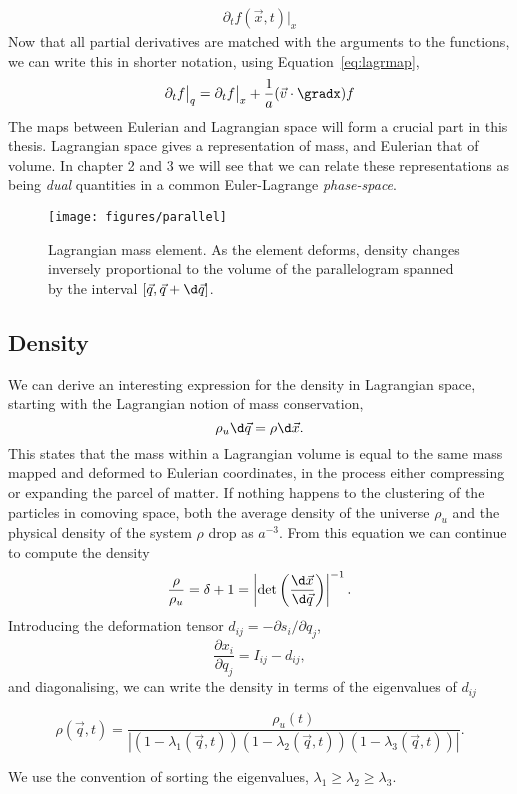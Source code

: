 \begin{subappendices}
\begin{align}
\partial_t f(\vec{x}, t)\big|_x
\end{align}
Now that all partial derivatives are matched with the arguments to the functions, we can write this in shorter notation, using Equation~\ref{eq:lagrmap},
\begin{equation}
\partial_t f \big|_q = \partial_t f \big|_x + \frac{1}{a} (\vec{v} \cdot \gradx) f
\end{equation}
The maps between Eulerian and Lagrangian space will form a crucial part in this thesis. Lagrangian space gives a representation of mass, and Eulerian that of volume. In chapter 2 and 3 we will see that we can relate these representations as being \emph{dual} quantities in a common Euler-Lagrange \emph{phase-space}. \\

\begin{SCfigure}[2.0]
    \texttt{[image: figures/parallel]}
    \caption{Lagrangian mass element. As the element deforms, density changes inversely proportional to the volume of the parallelogram spanned by the interval $[\vec{q}, \vec{q} + \d\vec{q}]$.} \label{fig:parallel}
\end{SCfigure}

\subsection{Density}
We can derive an interesting expression for the density in Lagrangian space, starting with the Lagrangian notion of mass conservation,
\begin{equation}
\rho_u \d \vec{q} = \rho \d \vec{x}.
\end{equation}
This states that the mass within a Lagrangian volume is equal to the same mass mapped and deformed to Eulerian coordinates, in the process either compressing or expanding the parcel of matter. If nothing happens to the clustering of the particles in comoving space, both the average density of the universe $\rho_u$ and the physical density of the system $\rho$ drop as $a^{-3}$. From this equation we can continue to compute the density
\begin{equation}
\frac{\rho}{\rho_u} = \delta + 1 = \left|\det\left(\frac{\d \vec{x}}{\d \vec{q}}\right)\right|^{-1}.
\end{equation}
Introducing the deformation tensor $d_{ij} = -\partial s_{i}/\partial q_{j}$,
\begin{equation}
\frac{\partial x_{i}}{\partial q_{j}} = I_{ij} - d_{ij},
\end{equation}
and diagonalising, we can write the density in terms of the eigenvalues of $d_{ij}$
\begin{shaded*}
\begin{equation}
\rho(\vec{q}, t) = \frac{\rho_u(t)}{\left|\left(1 - \lambda_1(\vec{q}, t)\right)
\left(1 - \lambda_2(\vec{q}, t)\right) \left(1 - \lambda_3(\vec{q},
t)\right)\right|}.
\label{eq:density}
\end{equation}
\end{shaded*}
We use the convention of sorting the eigenvalues, $\lambda_1 \ge \lambda_2 \ge \lambda_3$.


\end{subappendices}
